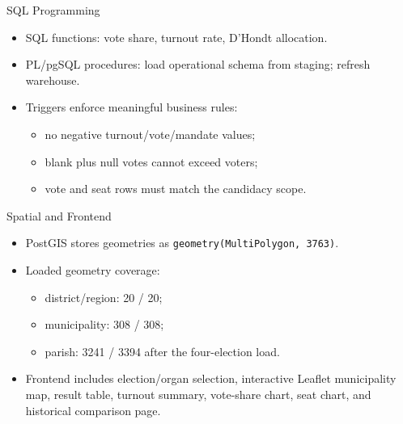 \documentclass[aspectratio=169]{beamer}
\begin{document}
\begin{frame}{SQL Programming}
  \begin{itemize}
    \item SQL functions: vote share, turnout rate, D'Hondt allocation.
    \item PL/pgSQL procedures: load operational schema from staging; refresh warehouse.
    \item Triggers enforce meaningful business rules:
      \begin{itemize}
        \item no negative turnout/vote/mandate values;
        \item blank plus null votes cannot exceed voters;
        \item vote and seat rows must match the candidacy scope.
      \end{itemize}
  \end{itemize}
\end{frame}

\begin{frame}{Spatial and Frontend}
  \begin{itemize}
    \item PostGIS stores geometries as \texttt{geometry(MultiPolygon, 3763)}.
    \item Loaded geometry coverage:
      \begin{itemize}
        \item district/region: 20 / 20;
        \item municipality: 308 / 308;
        \item parish: 3241 / 3394 after the four-election load.
      \end{itemize}
    \item Frontend includes election/organ selection, interactive Leaflet municipality map, result table, turnout summary, vote-share chart, seat chart, and historical comparison page.
  \end{itemize}
\end{frame}
\end{document}
